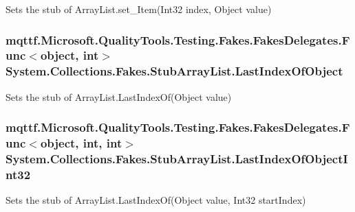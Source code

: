 Sets the stub of Array\-List.\-set\-\_\-\-Item(\-Int32 index, Object value)

\hypertarget{class_system_1_1_collections_1_1_fakes_1_1_stub_array_list_a8a42a5630733bc4449938e72a6ac1079}{
\subsubsection[{Last\-Index\-Of\-Object}]{\setlength{\rightskip}{0pt plus 5cm}mqttf.\-Microsoft.\-Quality\-Tools.\-Testing.\-Fakes.\-Fakes\-Delegates.\-Func$<$object, int$>$ System.\-Collections.\-Fakes.\-Stub\-Array\-List.\-Last\-Index\-Of\-Object}}\label{class_system_1_1_collections_1_1_fakes_1_1_stub_array_list_a8a42a5630733bc4449938e72a6ac1079}


Sets the stub of Array\-List.\-Last\-Index\-Of(\-Object value)

\hypertarget{class_system_1_1_collections_1_1_fakes_1_1_stub_array_list_ae5faf8f0a373d1bfb7307460ba7c2cad}{
\subsubsection[{Last\-Index\-Of\-Object\-Int32}]{\setlength{\rightskip}{0pt plus 5cm}mqttf.\-Microsoft.\-Quality\-Tools.\-Testing.\-Fakes.\-Fakes\-Delegates.\-Func$<$object, int, int$>$ System.\-Collections.\-Fakes.\-Stub\-Array\-List.\-Last\-Index\-Of\-Object\-Int32}}\label{class_system_1_1_collections_1_1_fakes_1_1_stub_array_list_ae5faf8f0a373d1bfb7307460ba7c2cad}


Sets the stub of Array\-List.\-Last\-Index\-Of(\-Object value, Int32 start\-Index)

